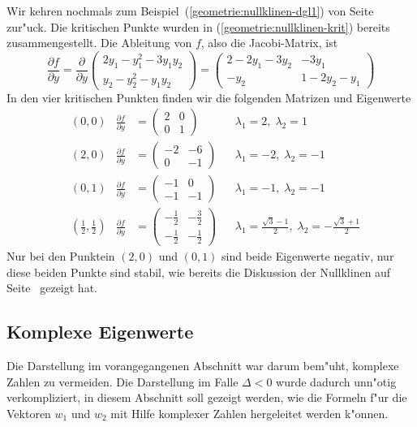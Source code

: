 \begin{beispiel}
Wir kehren nochmals zum Beispiel~(\ref{geometrie:nullklinen-dgl1})
von Seite~\pageref{geometrie:nullklinen-dgl1} zur"uck.
Die kritischen Punkte wurden in (\ref{geometrie:nullklinen-krit}) bereits
zusammengestellt.
Die Ableitung von $f$, also die Jacobi-Matrix, ist
\[
\frac{\partial f}{\partial y}
=
\frac{\partial}{\partial y}
\begin{pmatrix}
2y_1-y_1^2-3y_1y_2\\
y_2-y_2^2-y_1y_2
\end{pmatrix}
=
\begin{pmatrix}
2-2y_1-3y_2 & -3y_1\\
-y_2        &1-2y_2-y_1
\end{pmatrix}
\]
In den vier kritischen Punkten finden wir die folgenden Matrizen und
Eigenwerte
\begin{align*}
&(0,0)
	&\frac{\partial f}{\partial y}&=\begin{pmatrix}2&0\\0&1\end{pmatrix}
		&&\lambda_1=2,\;\lambda_2=1\\
&(2,0)
	&\frac{\partial f}{\partial y}&=\begin{pmatrix}-2&-6\\0&-1\end{pmatrix}
		&&\lambda_1=-2,\;\lambda_2=-1\\
&(0,1)
	&\frac{\partial f}{\partial y}&=\begin{pmatrix}-1&0\\-1&-1\end{pmatrix}
		&&\lambda_1=-1,\;\lambda_2=-1\\
&\textstyle(\frac12,\frac12)
	&\frac{\partial f}{\partial y}&=\begin{pmatrix}-\frac12&-\frac32\\-\frac12&-\frac12\end{pmatrix}
		&&\lambda_1=\frac{\sqrt{3}-1}2,\;\lambda_2=-\frac{\sqrt{3}+1}2
\end{align*}
Nur bei den Punktein $(2,0)$ und $(0,1)$ sind beide Eigenwerte negativ,
nur diese beiden Punkte sind stabil, wie bereits die  Diskussion der
Nullklinen auf Seite~\pageref{geometrie:nullklinen-stabilitaet}
gezeigt hat.
\end{beispiel}

%
%
\subsection{Komplexe Eigenwerte}
Die Darstellung im vorangegangenen Abschnitt war darum bem"uht,
komplexe Zahlen zu vermeiden.
Die Darstellung im Falle $\Delta<0$ wurde dadurch unn"otig verkompliziert,
in diesem Abschnitt soll gezeigt werden, wie die Formeln f"ur die Vektoren
$w_1$ und $w_2$ mit Hilfe komplexer Zahlen hergeleitet werden k"onnen.

